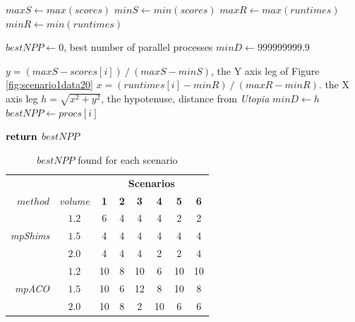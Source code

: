 \documentclass[preprint,authoryear]{elsarticle}
\begin{document}
\begin{algorithm}[H]
	\caption{$getBestNPP(scores, runtimes, procs)$}  \label{alg:bestnum}
	\begin{algorithmic}[1]
		\State $maxS   \gets max(scores)$
		\State $minS   \gets min(scores)$
		\State $maxR \gets max(runtimes)$
		\State $minR \gets min(runtimes)$
		
		\State $bestNPP \gets 0$, best number of parallel processes
		\State $minD \gets 999999999.9$		
		
			\State $y = ( maxS - scores[i] )\ /\ (maxS   - minS  )$, the Y axis leg of Figure \ref{fig:scenario1data20}
			\State $x = ( runtimes[i] - minR )\ /\ (maxR - minR)$. the X axis leg
			\State $h = \sqrt{x^2 + y^2}$, the hypotenuse, distance from {\it Utopia}
				\State $minD \gets h$
				\State $bestNPP \gets procs[i]$
			\EndIf
		
		\EndFor
		
		\State ${\bf return}$ $bestNPP$
	\end{algorithmic}
\end{algorithm}


\vspace{2.0mm}

\begin{table}[H]
\centering
\caption{$bestNPP$ found for each scenario}  \label{tab:numProcs}
	\footnotesize
\begin{tabular}{rccccccc}
\toprule
                               &               &\multicolumn{6}{c}{\bf Scenarios} \\
                               \cmidrule{3-8}
{$method$}                     &{\it volume}&{\bf 1}&{\bf 2}&{\bf 3}&{\bf 4}&{\bf 5}&{\bf 6} \\
\toprule

\multirow{3}{*}{\it {mpShims}} &$1.2$& 6       & 4     & 4     & 4     & 2     & 2    \\ 
                               &$1.5$& 4       & 4     & 4     & 4     & 4     & 4    \\
                               &$2.0$& 4       & 4     & 4     & 2     & 2     & 4    \\
\midrule[.1pt]

\multirow{3}{*}{\it {mpACO}}   &$1.2$& 10      & 8     & 10    & 6     & 10    & 10   \\ 
                               &$1.5$& 10      & 6     & 12    & 8     & 10    & 8    \\
                               &$2.0$& 10      & 8     & 2     & 10    & 6     & 6    \\                               
\bottomrule		
\end{tabular}

\normalsize

\end{table}
\end{document}
